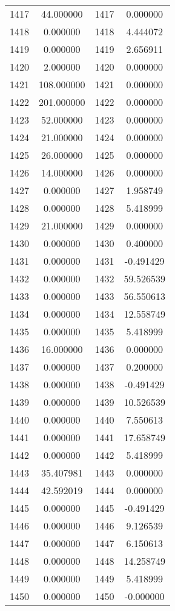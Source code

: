 \documentclass[12pt]{article}
\begin{document}
\begin{longtable}{@{}cccc@{}}
1417 & 44.000000 & 1417 & 0.000000 \\
1418 & 0.000000 & 1418 & 4.444072 \\
1419 & 0.000000 & 1419 & 2.656911 \\
1420 & 2.000000 & 1420 & 0.000000 \\
1421 & 108.000000 & 1421 & 0.000000 \\
1422 & 201.000000 & 1422 & 0.000000 \\
1423 & 52.000000 & 1423 & 0.000000 \\
1424 & 21.000000 & 1424 & 0.000000 \\
1425 & 26.000000 & 1425 & 0.000000 \\
1426 & 14.000000 & 1426 & 0.000000 \\
1427 & 0.000000 & 1427 & 1.958749 \\
1428 & 0.000000 & 1428 & 5.418999 \\
1429 & 21.000000 & 1429 & 0.000000 \\
1430 & 0.000000 & 1430 & 0.400000 \\
1431 & 0.000000 & 1431 & -0.491429 \\
1432 & 0.000000 & 1432 & 59.526539 \\
1433 & 0.000000 & 1433 & 56.550613 \\
1434 & 0.000000 & 1434 & 12.558749 \\
1435 & 0.000000 & 1435 & 5.418999 \\
1436 & 16.000000 & 1436 & 0.000000 \\
1437 & 0.000000 & 1437 & 0.200000 \\
1438 & 0.000000 & 1438 & -0.491429 \\
1439 & 0.000000 & 1439 & 10.526539 \\
1440 & 0.000000 & 1440 & 7.550613 \\
1441 & 0.000000 & 1441 & 17.658749 \\
1442 & 0.000000 & 1442 & 5.418999 \\
1443 & 35.407981 & 1443 & 0.000000 \\
1444 & 42.592019 & 1444 & 0.000000 \\
1445 & 0.000000 & 1445 & -0.491429 \\
1446 & 0.000000 & 1446 & 9.126539 \\
1447 & 0.000000 & 1447 & 6.150613 \\
1448 & 0.000000 & 1448 & 14.258749 \\
1449 & 0.000000 & 1449 & 5.418999 \\
1450 & 0.000000 & 1450 & -0.000000 \\

\end{longtable}
\end{document}
